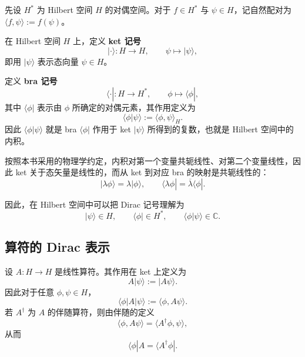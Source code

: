 \documentclass[UTF8,a4paper,11pt,openany]{ctexbook}
\begin{document}
先设 $H^*$ 为 Hilbert 空间 $H$ 的对偶空间。对于 $f\in H^*$ 与 $\psi\in H$，记自然配对为 $\langle f,\psi\rangle:=f(\psi)$。

\begin{definition}
在 Hilbert 空间 $H$ 上，定义 \textbf{ket 记号}
\begin{equation}
    |\cdot\rangle:H\to H,
    \qquad
    \psi\longmapsto|\psi\rangle,
\end{equation}
即用 $|\psi\rangle$ 表示态向量 $\psi\in H$。

定义 \textbf{bra 记号}
\begin{equation}
    \langle\cdot|:H\to H^*,
    \qquad
    \phi\longmapsto\langle\phi|,
\end{equation}
其中 $\langle\phi|$ 表示由 $\phi$ 所确定的对偶元素，其作用定义为
\begin{equation}
    \langle\phi|\psi\rangle
    :=
    \langle\phi,\psi\rangle_H.
\end{equation}
因此 $\langle\phi|\psi\rangle$ 就是 bra $\langle\phi|$ 作用于 ket $|\psi\rangle$ 所得到的复数，也就是 Hilbert 空间中的内积。
\end{definition}
按照本书采用的物理学约定，内积对第一个变量共轭线性、对第二个变量线性，因此 ket 关于态矢量是线性的，而从 ket 到对应 bra 的映射是共轭线性的：
\begin{equation}
    |\lambda\phi\rangle=\lambda|\phi\rangle,
    \qquad
    \langle\lambda\phi|
    =
    \overline{\lambda}\langle\phi|.
\end{equation}

因此，在 Hilbert 空间中可以把 Dirac 记号理解为
\[
|\psi\rangle\in H,
\qquad
\langle\phi|\in H^*,
\qquad
\langle\phi|\psi\rangle\in\mathbb C.
\]

\subsection{算符的 Dirac 表示}

设 $A:H\to H$ 是线性算符。其作用在 ket 上定义为
\begin{equation}
    A|\psi\rangle:=|A\psi\rangle.
\end{equation}
因此对于任意 $\phi,\psi\in H$，
\begin{equation}
    \langle\phi|A|\psi\rangle:=\langle\phi,A\psi\rangle.
\end{equation}
若 $A^\dagger$ 为 $A$ 的伴随算符，则由伴随的定义
\begin{equation}
    \langle\phi,A\psi\rangle
    =
    \langle A^\dagger\phi,\psi\rangle,
\end{equation}
从而
\begin{equation}
    \langle\phi|A
    =
    \langle A^\dagger\phi|.
\end{equation}
\end{document}
